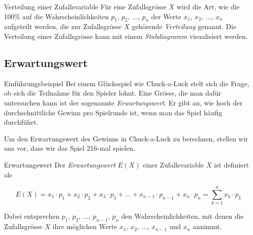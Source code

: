\begin{bsp}
\end{bsp}

\begin{definition}
    {Verteilung einer Zufallsvariable}{}
    Für eine Zufallsgrösse \( X \) wird die Art, wie die 100\% auf die Wahrscheinlichkeiten \( p_1,\, p_2,\, \ldots,\, p_n \) der Werte \( x_1,\, x_2,\, \ldots,\, x_n \) aufgeteilt werden, die zur Zufallsgrösse \( X \) gehörende \textit{Verteilung} genannt.
    Die Verteilung einer Zufallsgrösse kann mit einem \textit{Stabdiagramm} visualisiert werden.

\end{definition}

\subsection{Erwartungswert}

\begin{bsp}
    {Einführungsbeispiel}{}
    Bei einem Glücksspiel wie Chuck-a-Luck stelt sich die Frage, ob sich die Teilnahme für den Spieler lohnt. Eine Grösse, die man dafür untersuchen kann ist der sogenannte \emph{Erwartungswert}. Er gibt an, wie hoch der durchschnittliche Gewinn pro Spielrunde ist, wenn man das Spiel häufig durchführt.

    Um den Erwartungswert des Gewinns in Chuck-a-Luck zu berechnen, stellen wir uns vor, dass wir das Spiel 216-mal spielen.




    \vspace*{5cm}








\end{bsp}

\begin{definition}
    {Erwartungswert}{}
    Der \textit{Erwartungswert} \( E(X) \) einer Zufallsvariable \( X \) ist definiert als

    \[
        E(X) = x_1 \cdot p_1 + x_2 \cdot p_2 + x_3 \cdot p_3 + \ldots + x_{n-1} \cdot p_{n-1} + x_n \cdot p_n
        = \sum_{k=1}^{n} x_k \cdot p_k
    \]

    Dabei entsprechen \( p_1,\, p_2,\, \ldots,\, p_{n-1},\, p_n \) den Wahrscheinlichkeiten, mit denen die Zufallsgrösse \( X \) ihre möglichen Werte \( x_1,\, x_2,\, \ldots,\, x_{n-1} \) und \( x_n \) annimmt.

\end{definition}

